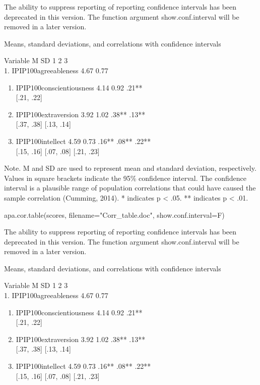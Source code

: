 \documentclass[
]{article}
\newenvironment{Shaded}{\begin{snugshade}}{\end{snugshade}}
\newcommand{\AttributeTok}[1]{\textcolor[rgb]{0.77,0.63,0.00}{#1}}
\newcommand{\FunctionTok}[1]{\textcolor[rgb]{0.00,0.00,0.00}{#1}}
\newcommand{\NormalTok}[1]{#1}
\newcommand{\StringTok}[1]{\textcolor[rgb]{0.31,0.60,0.02}{#1}}
\begin{document}
The ability to suppress reporting of reporting confidence intervals has been deprecated in this version.
The function argument show.conf.interval will be removed in a later version.

Means, standard deviations, and correlations with confidence intervals

Variable M SD 1 2 3\\
1. IPIP100agreeableness 4.67 0.77

\begin{enumerate}
\def\labelenumi{\arabic{enumi}.}
\setcounter{enumi}{1}
\item
  IPIP100conscientiousness 4.14 0.92 .21**\\
  {[}.21, .22{]}
\item
  IPIP100extraversion 3.92 1.02 .38** .13**\\
  {[}.37, .38{]} {[}.13, .14{]}
\item
  IPIP100intellect 4.59 0.73 .16** .08** .22**\\
  {[}.15, .16{]} {[}.07, .08{]} {[}.21, .23{]}
\end{enumerate}

Note. M and SD are used to represent mean and standard deviation, respectively.
Values in square brackets indicate the 95\% confidence interval.
The confidence interval is a plausible range of population correlations
that could have caused the sample correlation (Cumming, 2014).
* indicates p \textless{} .05. ** indicates p \textless{} .01.

\begin{Shaded}
\begin{Highlighting}[]
\FunctionTok{apa.cor.table}\NormalTok{(scores, }\AttributeTok{filename=}\StringTok{"Corr\_table.doc"}\NormalTok{, }\AttributeTok{show.conf.interval=}\NormalTok{F)}
\end{Highlighting}
\end{Shaded}

The ability to suppress reporting of reporting confidence intervals has been deprecated in this version.
The function argument show.conf.interval will be removed in a later version.

Means, standard deviations, and correlations with confidence intervals

Variable M SD 1 2 3\\
1. IPIP100agreeableness 4.67 0.77

\begin{enumerate}
\def\labelenumi{\arabic{enumi}.}
\setcounter{enumi}{1}
\item
  IPIP100conscientiousness 4.14 0.92 .21**\\
  {[}.21, .22{]}
\item
  IPIP100extraversion 3.92 1.02 .38** .13**\\
  {[}.37, .38{]} {[}.13, .14{]}
\item
  IPIP100intellect 4.59 0.73 .16** .08** .22**\\
  {[}.15, .16{]} {[}.07, .08{]} {[}.21, .23{]}
\end{enumerate}
\end{document}

